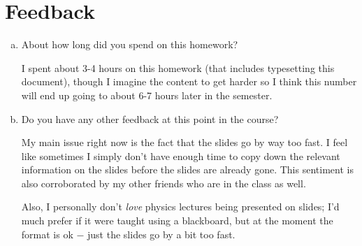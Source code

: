 \documentclass[10pt]{article}
\begin{document}

    \section*{Feedback}

    \begin{enumerate}[(a)]
        \item About how long did you spend on this homework?
        
        I spent about 3-4 hours on this homework (that includes typesetting this document), though I imagine the content to get harder so I think this number will end up going to about 6-7 hours later in the semester.


        \item Do you have any other feedback at this point in the course?
        
        My main issue right now is the fact that the slides go by way too fast. I feel like sometimes I simply don't have enough time to copy down the relevant information on the slides before the slides are already gone. This sentiment is also corroborated by my other friends who are in the class as well.

        Also, I personally don't \textit{love} physics lectures being presented on slides; I'd much prefer if it were taught using a blackboard, but at the moment the format is ok $-$ just the slides go by a bit too fast.


    \end{enumerate}
\end{document}
